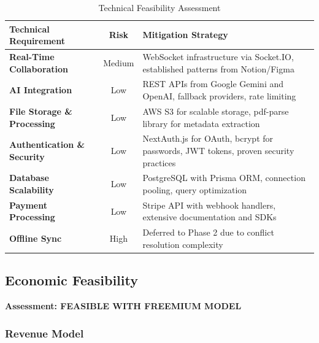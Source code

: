 \begin{table}[H]
    \centering
    \begin{tabularx}{\textwidth}{|l|c|X|}
        \hline
        \textbf{Technical Requirement}      & \textbf{Risk} & \textbf{Mitigation Strategy} \\
        \hline
        \textbf{Real-Time Collaboration}    & Medium        &
        WebSocket infrastructure via Socket.IO, established patterns from Notion/Figma     \\
        \hline
        \textbf{AI Integration}             & Low           &
        REST APIs from Google Gemini and OpenAI, fallback providers, rate limiting         \\
        \hline
        \textbf{File Storage \& Processing} & Low           &
        AWS S3 for scalable storage, pdf-parse library for metadata extraction             \\
        \hline
        \textbf{Authentication \& Security} & Low           &
        NextAuth.js for OAuth, bcrypt for passwords, JWT tokens, proven security practices \\
        \hline
        \textbf{Database Scalability}       & Low           &
        PostgreSQL with Prisma ORM, connection pooling, query optimization                 \\
        \hline
        \textbf{Payment Processing}         & Low           &
        Stripe API with webhook handlers, extensive documentation and SDKs                 \\
        \hline
        \textbf{Offline Sync}               & High          &
        Deferred to Phase 2 due to conflict resolution complexity                          \\
        \hline
    \end{tabularx}
    \caption{Technical Feasibility Assessment}
    \label{table:technical-feasibility}
\end{table}

\subsection{Economic Feasibility}

\textbf{Assessment: FEASIBLE WITH FREEMIUM MODEL}

\subsubsection{Revenue Model}

